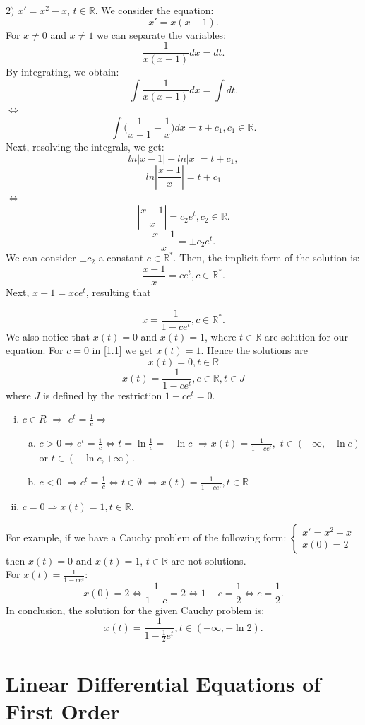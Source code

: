 \documentclass[a4paper, 11pt]{report}
\newcommand{\R}{\mathbb{R}}
\begin{document}
$2)$ $x'=x^{2}-x$, $t\in \R.$ We consider the equation: $$x'=x(x-1).$$ For $x\neq0$ and $x\neq1$ we can separate the variables: $$\frac{1}{x(x-1)}dx=dt.$$ By integrating, we obtain: $$\int \frac{1}{x(x-1)} dx = \int dt.$$ $\Leftrightarrow$ $$\int \bigg(\frac{1}{x-1}-\frac{1}{x}\bigg)dx=t+c_{1}, c_{1} \in \R.$$ Next, resolving the integrals, we get:
$$ln|x-1|-ln|x|=t+c_{1},$$ $$ln|\frac{x-1}{x}|=t+c_{1}$$ $\Leftrightarrow$ $$|\frac{x-1}{x}|=c_{2}e^{t}, c_{2} \in \R.$$ $$\frac{x-1}{x}=\pm c_{2} e^{t}.$$ We can consider $\pm c_{2}$ a constant $c \in \R^{*}$. Then, the implicit form of the solution is: $$\frac{x-1}{x}=ce^{t}, c\in \R^{*}.$$ Next, $x-1=xce^{t}$, resulting that 

\begin{equation}
x=\frac{1}{1-ce^{t}}, c\in \R^{*}.
\end{equation}
We also notice that $x(t)=0$ and $x(t)=1$, where $t\in \R$ are solution for our equation. For $c=0$ in \eqref{1.1} we get $x(t)=1$. Hence the solutions are $$x(t)=0, t\in\R$$ $$x(t)=\frac{1}{1-ce^{t}}, c\in \R, t\in J$$ where $J$ is defined by the restriction $1-ce^{t}=0$.
\begin{enumerate}[(i)]
 \item $c \in R$ $\Rightarrow$ $e^{t}=\frac{1}{c}\Rightarrow$
 \begin{enumerate}[(a)]
  \item $c>0\Rightarrow e^{t}=\frac{1}{c} \Leftrightarrow t=\ln{\frac{1}{c}}=-\ln {c}$ $\Rightarrow x(t)=\frac{1}{1-ce^{t}},$ $t\in (-\infty,-\ln{c})$ or $t\in (-\ln{c},+\infty)$.
  \item $c<0$ $\Rightarrow e^{t}=\frac{1}{c} \Leftrightarrow t\in \emptyset$ $\Rightarrow x(t)=\frac{1}{1-ce^{t}}, t\in \R$
 \end{enumerate}
 \item $c=0 \Rightarrow x(t)=1, t\in \R.$
\end{enumerate}
For example, if we have a Cauchy problem of the following form:
$\begin{cases}
  x'=x^{2}-x\\
  x(0)=2
 \end{cases}
$
then $x(t)=0$ and $x(t)=1$, $t\in \R$ are not solutions.\\
For $x(t)=\frac{1}{1-ce^{t}}$: $$x(0)=2 \Leftrightarrow \frac{1}{1-c}=2 \Leftrightarrow 1-c=\frac{1}{2} \Leftrightarrow c=\frac{1}{2}.$$ In conclusion, the solution for the given Cauchy problem is:$$x(t)=\frac{1}{1-\frac{1}{2}e^{t}}, t\in (-\infty,-\ln{2}).$$


\section{Linear Differential Equations of First Order}
\end{document}
